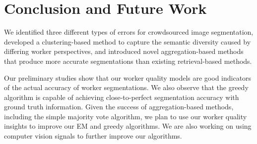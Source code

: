 \documentclass[letterpaper]{article}
\begin{document}
\section{Conclusion and Future Work}
We identified three different types of errors for crowdsourced image segmentation, developed a clustering-based method to capture the semantic diversity caused by differing worker perspectives, and introduced novel aggregation-based methods that produce more accurate segmentations than existing retrieval-based methods.
\par Our preliminary studies show that our worker quality models are good indicators of the actual accuracy of worker segmentations. We also observe that the greedy algorithm is capable of achieving close-to-perfect segmentation accuracy with ground truth information. Given the success of aggregation-based methods, including the simple majority vote algorithm, we plan to use our worker quality insights to improve our EM and greedy algorithms. 
We are also working on using computer vision signals to further improve our algorithms.


\balance  


\end{document}
